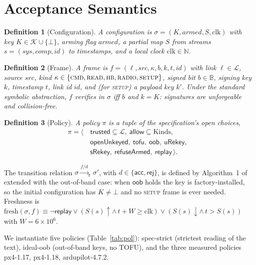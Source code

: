 \documentclass[conference]{IEEEtran}
\newtheorem{definition}{Definition}
\begin{document}
\section{Acceptance Semantics}
\label{sec:sem}

\begin{definition}[Configuration]
A configuration is $\sigma=(K,\mathit{armed},S,\mathrm{clk})$ with key
$K\in\mathcal{K}\cup\{\bot\}$, arming flag $\mathit{armed}$, a partial map $S$
from streams $s=(\mathit{sys},\mathit{comp},\mathit{id})$ to timestamps, and a
local clock $\mathrm{clk}\in\mathbb{N}$.
\end{definition}

\begin{definition}[Frame]
A frame is $f=(\ell,\mathit{src},\kappa,b,k,t,\mathit{id})$ with link
$\ell\in\mathcal{L}$, source $\mathit{src}$, kind
$\kappa\in\{\textsc{cmd},\textsc{read},\textsc{hb},\textsc{radio},\textsc{setup}\}$,
signed bit $b\in\mathbb{B}$, signing key $k$, timestamp $t$, link id
$\mathit{id}$, and (for \textsc{setup}) a payload key $k'$. Under the standard
symbolic abstraction, $f$ \emph{verifies} in $\sigma$ iff $b$ and $k=K$:
signatures are unforgeable and collision-free.
\end{definition}

\begin{definition}[Policy]
A policy $\pi$ is a tuple of the specification's open choices,
\begin{align*}
\pi=\langle\,&\mathsf{trusted}\subseteq\mathcal{L},\ \mathsf{allow}\subseteq\text{Kinds},\\
&\mathsf{openUnkeyed},\ \mathsf{tofu},\ \mathsf{oob},\ \mathsf{uRekey},\\
&\mathsf{sRekey},\ \mathsf{refuseArmed},\ \mathsf{replay}\,\rangle .
\end{align*}
\end{definition}

The transition relation $\sigma \xrightarrow{f/d}_\pi \sigma'$, with
$d\in\{\mathsf{acc},\mathsf{rej}\}$, is defined by Algorithm~1 of
\cite{brighouse2026signing} extended with the out-of-band case: when
$\mathsf{oob}$ holds the key is factory-installed, so the initial configuration
has $K\neq\bot$ and no \textsc{setup} frame is ever needed. Freshness is
$\mathrm{fresh}(\sigma,f)\equiv \neg\mathsf{replay}\lor (S(s)\!\uparrow \land\,
t+W\ge\mathrm{clk})\lor(S(s)\!\downarrow\land\,t>S(s))$ with $W=6{\times}10^6$.

We instantiate five policies (Table~\ref{tab:pol}): \textsf{spec-strict}
(strictest reading of the text), \textsf{ideal-oob} (out-of-band keys, no TOFU),
and the three measured policies \textsf{px4-1.17}, \textsf{px4-1.18},
\textsf{ardupilot-4.7.2}.
\end{document}
